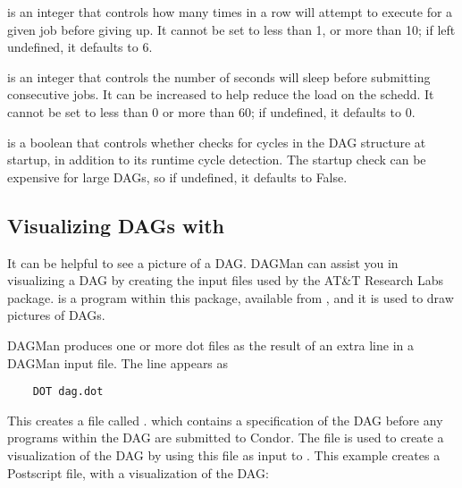  is an integer that controls how
many times in a row  will attempt to execute
 for a given job before giving up.  It cannot be
set to less than 1, or more than 10; if left undefined, it defaults to
6.

 is an integer that controls the number
of seconds  will sleep before submitting consecutive
jobs.  It can be increased to help reduce the load on the schedd.  It
cannot be set to less than 0 or more than 60; if undefined, it
defaults to 0.

 is a boolean that controls
whether  checks for cycles in the DAG structure at
startup, in addition to its runtime cycle detection.  The startup
check can be expensive for large DAGs, so if undefined, it defaults to
False.


\subsection{Visualizing DAGs with }

It can be helpful to see a picture of a DAG.
DAGMan can assist you in visualizing a DAG by creating
the input files used by the AT\&T Research Labs 
 package. 
 is a program within this package,
available from ,
and it is used to draw pictures of DAGs. 

DAGMan produces one or more dot files as the result of
an extra line
in a DAGMan input file. 
The line appears as
\begin{verbatim}
	DOT dag.dot
\end{verbatim}

This creates a file called .
which contains
a specification of the DAG before any programs within the DAG
are submitted to Condor.
The  file is used to create a visualization
of the DAG by using this file as input to .
This example creates a Postscript file, with a visualization of the DAG:

